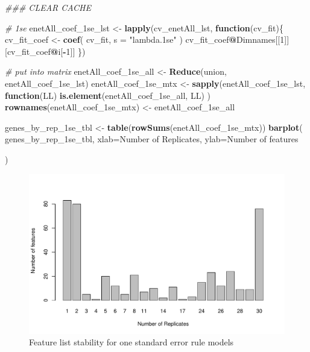 \documentclass[
]{book}
\newenvironment{Shaded}{\begin{snugshade}}{\end{snugshade}}
\newcommand{\CommentTok}[1]{\textcolor[rgb]{0.56,0.35,0.01}{\textit{#1}}}
\newcommand{\ControlFlowTok}[1]{\textcolor[rgb]{0.13,0.29,0.53}{\textbf{#1}}}
\newcommand{\DataTypeTok}[1]{\textcolor[rgb]{0.13,0.29,0.53}{#1}}
\newcommand{\DecValTok}[1]{\textcolor[rgb]{0.00,0.00,0.81}{#1}}
\newcommand{\KeywordTok}[1]{\textcolor[rgb]{0.13,0.29,0.53}{\textbf{#1}}}
\newcommand{\NormalTok}[1]{#1}
\newcommand{\OperatorTok}[1]{\textcolor[rgb]{0.81,0.36,0.00}{\textbf{#1}}}
\newcommand{\StringTok}[1]{\textcolor[rgb]{0.31,0.60,0.02}{#1}}
\begin{document}
\begin{Shaded}
\begin{Highlighting}[]
\CommentTok{\#\#\# CLEAR CACHE}


\CommentTok{\# 1se}
\NormalTok{enetAll\_coef\_1se\_lst <{-}}\StringTok{ }\KeywordTok{lapply}\NormalTok{(cv\_enetAll\_lst, }\ControlFlowTok{function}\NormalTok{(cv\_fit)\{}
\NormalTok{ cv\_fit\_coef <{-}}\StringTok{ }\KeywordTok{coef}\NormalTok{(}
\NormalTok{ cv\_fit,}
 \DataTypeTok{s =} \StringTok{"lambda.1se"}
\NormalTok{ )}
\NormalTok{ cv\_fit\_coef}\OperatorTok{@}\NormalTok{Dimnames[[}\DecValTok{1}\NormalTok{]][cv\_fit\_coef}\OperatorTok{@}\NormalTok{i[}\OperatorTok{{-}}\DecValTok{1}\NormalTok{]]}
\NormalTok{ \})}

\CommentTok{\# put into matrix}
\NormalTok{enetAll\_coef\_1se\_all <{-}}\StringTok{ }\KeywordTok{Reduce}\NormalTok{(union, enetAll\_coef\_1se\_lst)}
\NormalTok{enetAll\_coef\_1se\_mtx <{-}}\StringTok{ }\KeywordTok{sapply}\NormalTok{(enetAll\_coef\_1se\_lst, }
  \ControlFlowTok{function}\NormalTok{(LL) }\KeywordTok{is.element}\NormalTok{(enetAll\_coef\_1se\_all, LL)}
\NormalTok{)}
\KeywordTok{rownames}\NormalTok{(enetAll\_coef\_1se\_mtx) <{-}}\StringTok{ }\NormalTok{enetAll\_coef\_1se\_all}

\NormalTok{genes\_by\_rep\_1se\_tbl <{-}}\StringTok{ }\KeywordTok{table}\NormalTok{(}\KeywordTok{rowSums}\NormalTok{(enetAll\_coef\_1se\_mtx))}
\KeywordTok{barplot}\NormalTok{(}
\NormalTok{ genes\_by\_rep\_1se\_tbl,}
 \DataTypeTok{xlab=}\StringTok{\textquotesingle{}Number of Replicates\textquotesingle{}}\NormalTok{,}
 \DataTypeTok{ylab=}\StringTok{\textquotesingle{}Number of features\textquotesingle{}}

\NormalTok{)}
\end{Highlighting}
\end{Shaded}

\begin{figure}
\centering
\includegraphics{Static/figures/enet-feature-list-1se-1.pdf}
\caption{\label{fig:enet-feature-list-1se}Feature list stability for one standard error rule models}
\end{figure}
\end{document}

